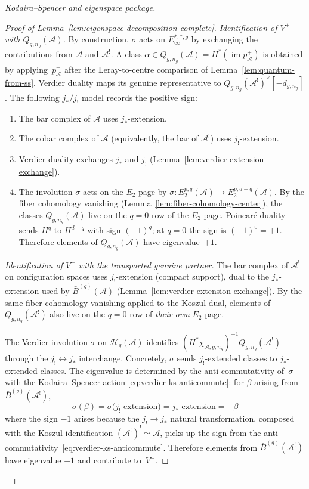 \begin{proof}[Kodaira--Spencer and eigenspace package]
\begin{proof}[Proof of Lemma~\ref{lem:eigenspace-decomposition-complete}]
\emph{Identification of $V^+$ with $Q_{g,n_g}(\mathcal{A})$.}
By construction, $\sigma$ acts on $E_\infty^{*,*,g}$ by exchanging the contributions
from $\mathcal{A}$ and $\mathcal{A}^!$.  A class
$\alpha\in Q_{g,n_g}(\mathcal A)=H^*(\operatorname{im}p^+_{\mathcal A})$
is obtained by applying~$p^+_{\mathcal A}$ after the Leray-to-centre
comparison of Lemma~\ref{lem:quantum-from-ss}.  Verdier duality maps
its genuine representative to
$Q_{g,n_g}(\mathcal A^!)^\vee[-d_{g,n_g}]$.  The following
$j_*/j_!$ model records the positive sign:
\begin{enumerate}
\item The bar complex of $\mathcal{A}$ uses $j_*$-extension.
\item The cobar complex of $\mathcal{A}$ (equivalently, the bar of $\mathcal{A}^!$)
uses $j_!$-extension.
\item Verdier duality exchanges $j_*$ and $j_!$
(Lemma~\ref{lem:verdier-extension-exchange}).
\item The involution $\sigma$ acts on the $E_2$ page by
$\sigma: E_2^{p,q}(\mathcal{A}) \to E_2^{p,d-q}(\mathcal{A})$.
By the fiber cohomology vanishing
(Lemma~\ref{lem:fiber-cohomology-center}), the classes
$Q_{g,n_g}(\mathcal{A})$ live on the $q = 0$ row of the $E_2$ page.
Poincar\'e duality sends $H^q$ to $H^{d-q}$ with sign $(-1)^q$;
at $q = 0$ the sign is $(-1)^0 = +1$. Therefore elements of
$Q_{g,n_g}(\mathcal{A})$ have eigenvalue~$+1$.
\end{enumerate}

\emph{Identification of $V^-$ with the transported genuine partner.}
The bar complex of $\mathcal{A}^!$ on configuration spaces uses
$j_!$-extension (compact support), dual to the $j_*$-extension used
by $\bar{B}^{(g)}(\mathcal{A})$
(Lemma~\ref{lem:verdier-extension-exchange}).
By the same fiber cohomology vanishing applied to the Koszul dual,
elements of $Q_{g,n_g}(\mathcal{A}^!)$ also live on the $q = 0$ row of
\emph{their own} $E_2$ page.

The Verdier involution $\sigma$ on
$\mathcal{H}_g(\mathcal{A})$ identifies
$(H^*\chi^-_{\mathcal A;g,n_g})^{-1}Q_{g,n_g}(\mathcal{A}^!)$
through the $j_! \leftrightarrow j_*$ interchange. Concretely, $\sigma$ sends
$j_!$-extended classes to $j_*$-extended classes.
The eigenvalue is determined by the anti-commutativity
of~$\sigma$ with the Kodaira--Spencer action
\eqref{eq:verdier-ks-anticommute}: for $\beta$ arising from
$\bar{B}^{(g)}(\mathcal{A}^!)$,
\[
\sigma(\beta)
= \sigma\bigl(\text{$j_!$-extension}\bigr)
= \text{$j_*$-extension}
= -\beta
\]
where the sign $-1$ arises because the $j_! \to j_*$ natural
transformation, composed with the Koszul identification
$(\mathcal{A}^!)^! \simeq \mathcal{A}$, picks up the sign from
the anti-commutativity~\eqref{eq:verdier-ks-anticommute}.
Therefore elements from $\bar{B}^{(g)}(\mathcal{A}^!)$ have
eigenvalue $-1$ and contribute to~$V^-$.


\end{proof}
\end{proof}

